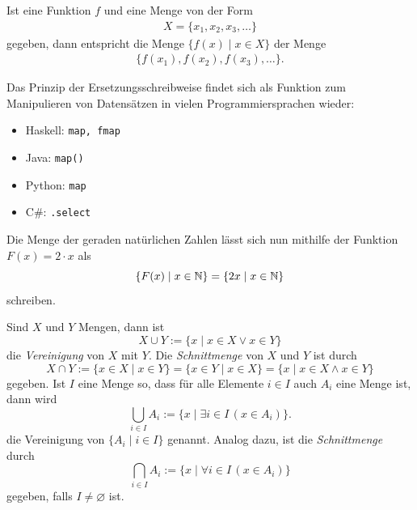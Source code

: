 \begin{rk}
    Ist eine Funktion $f$ und eine Menge von der Form
    \begin{align*}
        X=\{x_1,x_2,x_3,\dots\}
    \end{align*}
    gegeben, dann entspricht die Menge $\{f(x)\mid x\in X\}$ der Menge
    \begin{align*}
        \{f(x_1),f(x_2),f(x_3),\dots\}.
    \end{align*}
\end{rk}

\begin{rk}
    Das Prinzip der Ersetzungsschreibweise findet sich als Funktion zum Manipulieren von Datensätzen in vielen Programmiersprachen wieder:
    \begin{itemize}
        \item Haskell: \texttt{map, fmap}
        \item Java: \texttt{map()}
        \item Python: \texttt{map}
        \item C\#: \texttt{.select}
    \end{itemize}
\end{rk}

\begin{bsp}
Die Menge der geraden natürlichen Zahlen lässt sich nun mithilfe der Funktion $F(x)=2\cdot x$ als
\[
\{F(x)\mid x\in\mathbb{N}\} = \{2x\mid x\in\mathbb{N}\}
\]
schreiben.
\end{bsp}



\begin{df}
Sind $X$ und $Y$ Mengen, dann ist
\[
X\cup Y:=\{x\mid x\in X\lor x\in Y \}
\]
die \textit{Vereinigung} von $X$ mit $Y$. Die \textit{Schnittmenge} von $X$ und $Y$ ist durch
\[
X\cap Y:=\{x\in X\mid x\in Y \}=\{x\in Y\mid x\in X\}=\{x\mid x\in X\land x\in Y\}
\]
gegeben. Ist $I$ eine Menge so, dass für alle Elemente $i\in I$ auch $A_i$ eine Menge ist, dann wird
\[
\bigcup_{i\in I}A_i:=\{x\mid\exists i\in I\,(x\in A_i) \}.
\]
die Vereinigung von $\{A_i\mid i\in I\}$ genannt.
Analog dazu, ist die \textit{Schnittmenge} durch
\[
\bigcap_{i\in I}A_i:=\{x\mid\forall i\in I\,(x\in A_i) \}
\]
gegeben, falls $I\neq\varnothing$ ist.
\end{df}


